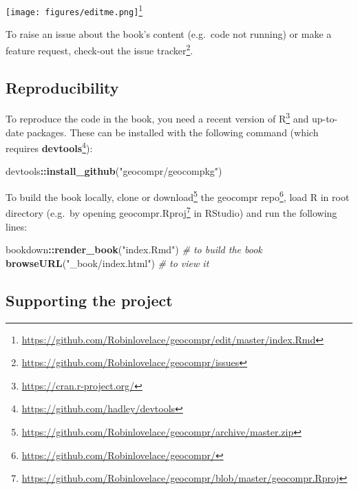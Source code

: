 \documentclass[]{krantz}
\newenvironment{Shaded}{\begin{snugshade}}{\end{snugshade}}
\newcommand{\CommentTok}[1]{\textcolor[rgb]{0.37,0.37,0.37}{\textit{#1}}}
\newcommand{\KeywordTok}[1]{\textcolor[rgb]{0.27,0.27,0.27}{\textbf{#1}}}
\newcommand{\NormalTok}[1]{#1}
\newcommand{\OperatorTok}[1]{\textcolor[rgb]{0.43,0.43,0.43}{\textbf{#1}}}
\newcommand{\StringTok}[1]{\textcolor[rgb]{0.5,0.5,0.5}{#1}}
\let\rmarkdownfootnote\footnote%
\def\footnote{\protect\rmarkdownfootnote}
\renewcommand{\href}[2]{#2\footnote{\url{#1}}}
\begin{document}
\href{https://github.com/Robinlovelace/geocompr/edit/master/index.Rmd}{\texttt{[image: figures/editme.png]}}

To raise an issue about the book's content (e.g.~code not running) or make a feature request, check-out the \href{https://github.com/Robinlovelace/geocompr/issues}{issue tracker}.

\hypertarget{reproducibility}{%
\subsection*{Reproducibility}\label{reproducibility}}

To reproduce the code in the book, you need a recent version of \href{https://cran.r-project.org/}{R} and up-to-date packages.
These can be installed with the following command (which requires \href{https://github.com/hadley/devtools}{\textbf{devtools}}):

\begin{Shaded}
\begin{Highlighting}[]
\NormalTok{devtools}\OperatorTok{::}\KeywordTok{install_github}\NormalTok{(}\StringTok{"geocompr/geocompkg"}\NormalTok{)}
\end{Highlighting}
\end{Shaded}

To build the book locally, clone or \href{https://github.com/Robinlovelace/geocompr/archive/master.zip}{download} the \href{https://github.com/Robinlovelace/geocompr/}{geocompr repo}, load R in root directory (e.g.~by opening \href{https://github.com/Robinlovelace/geocompr/blob/master/geocompr.Rproj}{geocompr.Rproj} in RStudio) and run the following lines:

\begin{Shaded}
\begin{Highlighting}[]
\NormalTok{bookdown}\OperatorTok{::}\KeywordTok{render_book}\NormalTok{(}\StringTok{"index.Rmd"}\NormalTok{) }\CommentTok{# to build the book}
\KeywordTok{browseURL}\NormalTok{(}\StringTok{"_book/index.html"}\NormalTok{) }\CommentTok{# to view it}
\end{Highlighting}
\end{Shaded}

\hypertarget{supporting-the-project}{%
\subsection*{Supporting the project}\label{supporting-the-project}}
\end{document}
